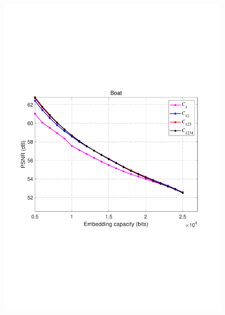 \documentclass[review,3p,10pt,sort&compress]{elsarticle}
\begin{document}
\begin{figure}
{\begin{minipage}[t]{0.39\linewidth}
\includegraphics[width=1\textwidth]{figures/Result/size/Boat.pdf}
\end{minipage}
}


\end{figure}
\end{document}
